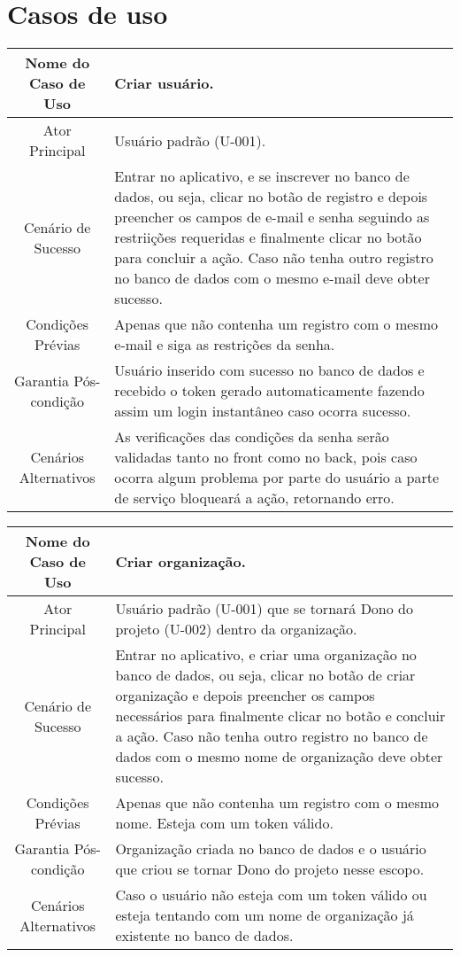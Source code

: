 \chapter{Casos de uso}

\vspace{1cm}

\begin{tabularx}{\textwidth}{|c|X|}
\hline
Nome do Caso de Uso & Criar usuário. \\ \hline
Ator Principal & Usuário padrão (U-001). \\ \hline
Cenário de Sucesso & Entrar no aplicativo, e se inscrever no banco de dados, ou seja, clicar no botão de registro e depois preencher os campos de e-mail e senha seguindo as restriições requeridas e finalmente clicar no botão para concluir a ação. Caso não tenha outro registro no banco de dados com o mesmo e-mail deve obter sucesso. \\ \hline
Condições Prévias & Apenas que não contenha um registro com o mesmo e-mail e siga as restrições da senha. \\ \hline
Garantia Pós-condição & Usuário inserido com sucesso no banco de dados e recebido o \gls{token} gerado automaticamente fazendo assim um login instantâneo caso ocorra sucesso. \\ \hline
Cenários Alternativos & As verificações das condições da senha serão validadas tanto no \gls{front} como no \gls{back}, pois caso ocorra algum problema por parte do usuário a parte de serviço bloqueará a ação, retornando erro. \\ \hline
\end{tabularx}

\vspace{1cm}

\begin{tabularx}{\textwidth}{|c|X|}
    \hline
    Nome do Caso de Uso & Criar organização. \\ \hline
    Ator Principal & Usuário padrão (U-001) que se tornará Dono do projeto (U-002) dentro da organização. \\ \hline
    Cenário de Sucesso & Entrar no aplicativo, e criar uma organização no banco de dados, ou seja, clicar no botão de criar organização e depois preencher os campos necessários para finalmente clicar no botão e concluir a ação. Caso não tenha outro registro no banco de dados com o mesmo nome de organização deve obter sucesso. \\ \hline
    Condições Prévias & Apenas que não contenha um registro com o mesmo nome. Esteja com um \gls{token} válido. \\ \hline
    Garantia Pós-condição & Organização criada no banco de dados e o usuário que criou se tornar Dono do projeto nesse escopo. \\ \hline
    Cenários Alternativos & Caso o usuário não esteja com um \gls{token} válido ou esteja tentando com um nome de organização já existente no banco de dados. \\ \hline
\end{tabularx}

